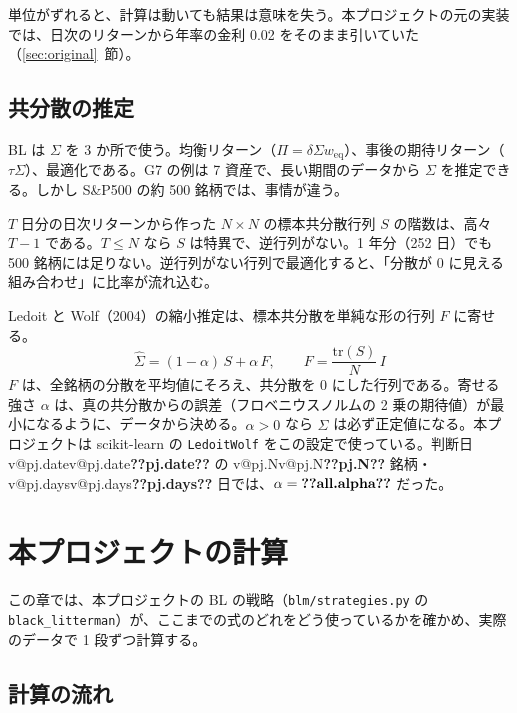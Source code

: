 \documentclass[xelatex,ja=standard,jafont=hiragino-pron,a4paper,11pt,openany]{bxjsreport}
\makeatletter
\newcommand{\V}[1]{\ifcsname v@#1\endcsname\csname v@#1\endcsname\else\textbf{??#1??}\fi}
\newcommand{\code}[1]{\texttt{#1}}
\newcommand{\SP}{S\&P500}
\newcommand{\weq}{w_{\mathrm{eq}}}
\newcommand{\secref}[1]{\ref{#1}~節}
\makeatother
\begin{document}
単位がずれると、計算は動いても結果は意味を失う。本プロジェクトの元の実装では、日次のリターンから年率の金利 0.02 をそのまま引いていた（\secref{sec:original}）。

\section{共分散の推定}\label{sec:lw}

BL は $\Sigma$ を 3 か所で使う。均衡リターン（$\Pi = \delta\Sigma\weq$）、事後の期待リターン（$\tau\Sigma$）、最適化である。G7 の例は 7 資産で、長い期間のデータから $\Sigma$ を推定できる。しかし \SP{} の約 500 銘柄では、事情が違う。

$T$ 日分の日次リターンから作った $N \times N$ の標本共分散行列 $S$ の階数は、高々 $T - 1$ である。$T \le N$ なら $S$ は特異で、逆行列がない。1 年分（252 日）でも 500 銘柄には足りない。逆行列がない行列で最適化すると、「分散が 0 に見える組み合わせ」に比率が流れ込む。

Ledoit と Wolf（2004）の縮小推定は、標本共分散を単純な形の行列 $F$ に寄せる。
\begin{equation}
\hat\Sigma = (1 - \alpha)\,S + \alpha\,F,\qquad F = \frac{\mathrm{tr}(S)}{N}\,I
\label{eq:lw}
\end{equation}
$F$ は、全銘柄の分散を平均値にそろえ、共分散を 0 にした行列である。寄せる強さ $\alpha$ は、真の共分散からの誤差（フロベニウスノルムの 2 乗の期待値）が最小になるように、データから決める。$\alpha > 0$ なら $\hat\Sigma$ は必ず正定値になる。本プロジェクトは scikit-learn の \code{LedoitWolf} をこの設定で使っている。判断日 \V{pj.date} の \V{pj.N} 銘柄・\V{pj.days} 日では、$\alpha = \V{all.alpha}$ だった。

\chapter{本プロジェクトの計算}\label{ch:project}

この章では、本プロジェクトの BL の戦略（\code{blm/strategies.py} の \code{black\_litterman}）が、ここまでの式のどれをどう使っているかを確かめ、実際のデータで 1 段ずつ計算する。

\section{計算の流れ}
\end{document}
